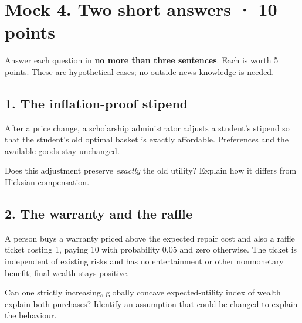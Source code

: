 \section*{Mock 4. Two short answers · 10 points}
Answer each question in \textbf{no more than three sentences}. Each is worth
5 points. These are hypothetical cases; no outside news knowledge is needed.
\subsection*{1. The inflation-proof stipend}
After a price change, a scholarship administrator adjusts a student's
stipend so that the student's old optimal basket is exactly affordable.
Preferences and the available goods stay unchanged.

Does this adjustment preserve \emph{exactly} the old utility? Explain how
it differs from Hicksian compensation.
\subsection*{2. The warranty and the raffle}
A person buys a warranty priced above the expected repair cost and also
a raffle ticket costing 1, paying 10 with probability $0.05$ and zero
otherwise. The ticket is independent of existing risks and has no
entertainment or other nonmonetary benefit; final wealth stays positive.

Can one strictly increasing, globally concave expected-utility index of wealth
explain both purchases? Identify an assumption that could be changed to
explain the behaviour.
